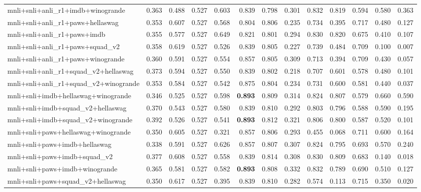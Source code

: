 \begin{table}[t]
\begin{tabular}{lrrrrrrrrrrrr}
    mnli+snli+anli\_r1+imdb+winogrande & 0.363 & 0.488 & 0.527 & 0.603 & 0.839 & 0.798 & 0.301 & 0.832 & 0.819 & 0.594 & 0.580 & 0.363 \\
    mnli+snli+anli\_r1+paws+hellaswag & 0.353 & 0.607 & 0.527 & 0.568 & 0.804 & 0.806 & 0.235 & 0.734 & 0.395 & 0.717 & 0.480 & 0.127 \\
    mnli+snli+anli\_r1+paws+imdb & 0.355 & 0.577 & 0.527 & 0.649 & 0.821 & 0.801 & 0.294 & 0.830 & 0.820 & 0.675 & 0.410 & 0.107 \\
    mnli+snli+anli\_r1+paws+squad\_v2 & 0.358 & 0.619 & 0.527 & 0.526 & 0.839 & 0.805 & 0.227 & 0.739 & 0.484 & 0.709 & 0.100 & 0.007 \\
    mnli+snli+anli\_r1+paws+winogrande & 0.360 & 0.591 & 0.527 & 0.554 & 0.857 & 0.805 & 0.309 & 0.713 & 0.394 & 0.709 & 0.430 & 0.057 \\
    mnli+snli+anli\_r1+squad\_v2+hellaswag & 0.373 & 0.594 & 0.527 & 0.550 & 0.839 & 0.802 & 0.218 & 0.707 & 0.601 & 0.578 & 0.480 & 0.101 \\
    mnli+snli+anli\_r1+squad\_v2+winogrande & 0.353 & 0.584 & 0.527 & 0.542 & 0.875 & 0.804 & 0.234 & 0.731 & 0.600 & 0.581 & 0.440 & 0.037 \\
    mnli+snli+imdb+hellaswag+winogrande & 0.346 & 0.525 & 0.527 & 0.598 & \textbf{0.893} & 0.809 & 0.314 & 0.824 & 0.807 & 0.579 & 0.660 & 0.590 \\
    mnli+snli+imdb+squad\_v2+hellaswag & 0.370 & 0.543 & 0.527 & 0.580 & 0.839 & 0.810 & 0.292 & 0.803 & 0.796 & 0.588 & 0.590 & 0.195 \\
    mnli+snli+imdb+squad\_v2+winogrande & 0.392 & 0.526 & 0.527 & 0.541 & \textbf{0.893} & 0.812 & 0.321 & 0.806 & 0.800 & 0.587 & 0.520 & 0.101 \\
    mnli+snli+paws+hellaswag+winogrande & 0.350 & 0.605 & 0.527 & 0.321 & 0.857 & 0.806 & 0.293 & 0.455 & 0.068 & 0.711 & 0.600 & 0.164 \\
    mnli+snli+paws+imdb+hellaswag & 0.338 & 0.591 & 0.527 & 0.626 & 0.857 & 0.807 & 0.307 & 0.824 & 0.795 & 0.693 & 0.570 & 0.240 \\
    mnli+snli+paws+imdb+squad\_v2 & 0.377 & 0.608 & 0.527 & 0.558 & 0.839 & 0.814 & 0.308 & 0.830 & 0.809 & 0.683 & 0.140 & 0.018 \\
    mnli+snli+paws+imdb+winogrande & 0.365 & 0.581 & 0.527 & 0.582 & \textbf{0.893} & 0.808 & 0.332 & 0.832 & 0.789 & 0.690 & 0.510 & 0.127 \\
    mnli+snli+paws+squad\_v2+hellaswag & 0.350 & 0.617 & 0.527 & 0.395 & 0.839 & 0.810 & 0.282 & 0.574 & 0.113 & 0.715 & 0.350 & 0.020 \\

\end{tabular}
\end{table}
